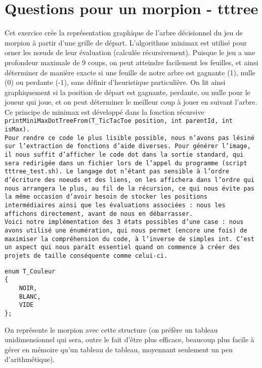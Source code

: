 \documentclass[14pt,a4paper]{article}
\begin{document}
\section{Questions pour un morpion - tttree}
Cet exercice crée la représentation graphique de l'arbre décisionnel du jeu de morpion à partir d'une grille de départ. L'algorithme minimax est utilisé pour orner les nœuds de leur évaluation (calculée récursivement). Puisque le jeu a une profondeur maximale de 9 coups, on peut atteindre facilement les feuilles, et ainsi déterminer de manière exacte si une feuille de notre arbre est gagnante (1), nulle (0) ou perdante (-1), sans définir d'heuristique particulière. On lit ainsi graphiquement si la position de départ est gagnante, perdante, ou nulle pour le joueur qui joue, et on peut déterminer le meilleur coup à jouer en suivant l'arbre. Ce principe de minimax est développé dans la fonction récursive \tt{printMiniMaxDotTreeFrom(T\_TicTacToe position, int parentId, int isMax)}.\\

Pour rendre ce code le plus lisible possible, nous n'avons pas lésiné sur l'extraction de fonctions d'aide diverses. Pour générer l'image, il nous suffit d'afficher le code dot dans la sortie standard, qui sera redirigée dans un fichier lors de l'appel du programme (script \tt{tttree\_test.sh}). Le langage dot n'étant pas sensible à l'ordre d'écriture des noeuds et des liens, on les affichera dans l'ordre qui nous arrangera le plus, au fil de la récursion, ce qui nous évite pas la même occasion d'avoir besoin de stocker les positions intermédiaires ainsi que les évaluations associées : nous les affichons directement, avant de nous en débarrasser.\\

Voici notre implémentation des 3 états possibles d'une case : nous avons utilisé une énumération, qui nous permet (encore une fois) de maximiser la compréhension du code, à l'inverse de simples int. C'est un aspect qui nous paraît essentiel quand on commence à créer des projets de taille conséquente comme celui-ci.

\begin{lstlisting}
enum T_Couleur
{
    NOIR,
    BLANC,
    VIDE
};
\end{lstlisting}
On représente le morpion avec cette structure (on préfère un tableau unidimensionnel qui sera, outre le fait d'être plus efficace, beaucoup plus facile à gérer en mémoire qu'un tableau de tableau, moyennant seulement un peu d'arithmétique\footnotemark).\\
\end{document}
